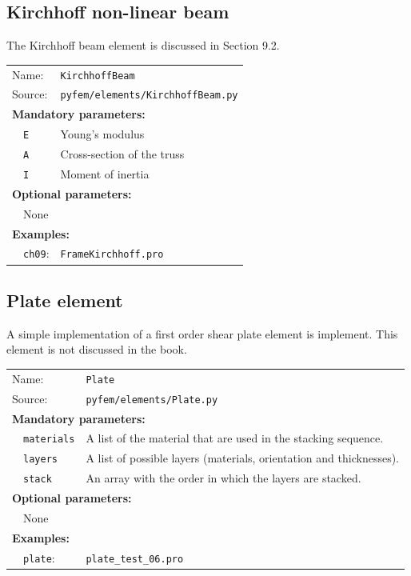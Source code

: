 \documentclass{article}
\begin{document}
\subsection{Kirchhoff non-linear beam}

The Kirchhoff beam element is discussed in Section 9.2.

\vspace{2mm}
\begin{tabular}{p{22mm}p{74mm}}
Name:         & \texttt{KirchhoffBeam} \\
Source:  & \texttt{pyfem/elements/KirchhoffBeam.py} \\
\multicolumn{2}{l}{\textbf{Mandatory parameters:}} \\
~~\texttt{E} & Young's modulus\\
~~\texttt{A} & Cross-section of the truss\\
~~\texttt{I} & Moment of inertia\\
\multicolumn{2}{l}{\textbf{Optional parameters:}} \\ 
~~None  & \\
\multicolumn{2}{l}{\textbf{Examples:}}\\
~~\texttt{ch09}: & \texttt{FrameKirchhoff.pro}
\end{tabular}

\subsection{Plate element}

A simple implementation of a first order shear plate element is implement. This 
element is not discussed in the book.

\vspace{2mm}
\begin{tabular}{p{22mm}p{74mm}}
Name:         & \texttt{Plate} \\
Source:  & \texttt{pyfem/elements/Plate.py} \\
\multicolumn{2}{l}{\textbf{Mandatory parameters:}} \\
~~\texttt{materials} & A list of the material that are used in the stacking sequence.\\
~~\texttt{layers} & A list of possible layers (materials, orientation and thicknesses).\\
~~\texttt{stack} & An array with the order in which the layers are stacked.\\
\multicolumn{2}{l}{\textbf{Optional parameters:}} \\ 
~~None  & \\
\multicolumn{2}{l}{\textbf{Examples:}}\\
~~\texttt{plate}: & \texttt{plate_test_06.pro}
\end{tabular}
\end{document}
